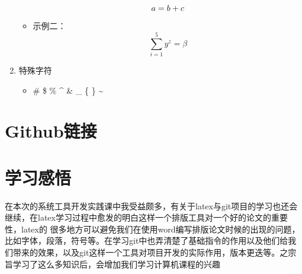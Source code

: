 \documentclass[a4paper, 12pt]{article}
\begin{document}
\begin{enumerate}
\begin{itemize}
\begin{equation}
                a =  b + c \\ 
              \end{equation}
        \item 示例二：
            \begin{equation}
                \sum_{i=1}^5 y^z = \beta
            \end{equation}
    \end{itemize}
\item {\large 特殊字符}
    \begin{itemize}
        \item \# \$ \% \^{} \& \_ \{ \} \~{}
    \end{itemize}
\end{enumerate}

\section{Github链接}


\section{学习感悟}
    在本次的系统工具开发实践课中我受益颇多，有关于latex与git项目的学习也还会继续，在latex学习过程中愈发的明白这样一个排版工具对一个好的论文的重要性，latex的
很多地方可以避免我们在使用word编写排版论文时候的出现的问题，比如字体，段落，符号等。在学习git中也弄清楚了基础指令的作用以及他们给我们带来的效果，以及git这样一个工具对项目开发的实际作用，版本更迭等。之宗旨学习了这么多知识后，会增加我们学习计算机课程的兴趣
\end{document}
